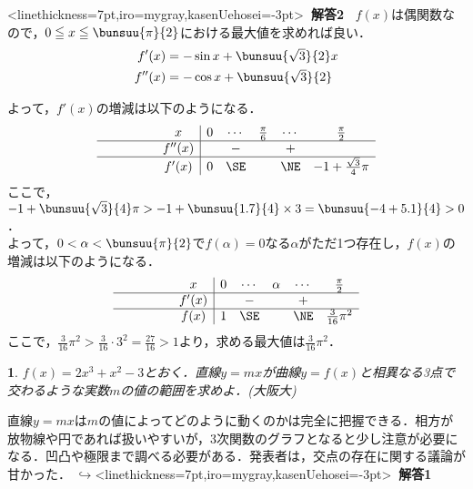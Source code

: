\documentclass[10pt,
b5paper,
fleqn,
dvipdfmx,
uplatex
]{jsarticle}
\newtheorem{question}[Question]{}
\newcommand{\bqu}{\begin{mybox}\begin{question}}
\newcommand{\equ}{\end{question}\end{mybox}}
\newcommand{\bb}{\bf\boldmath}%
\newcommand{\sq}{\textstyle\sqrt}
\renewenvironment{leftbar}{%
\def\FrameCommand{\vrule width 1pt \hspace{1zw}}
\MakeFramed{\advance\hsize-\width \FrameRestore}}%
{\endMakeFramed}
\newenvironment{leftbbar}{%
\def\FrameCommand{\color{mygray} \vrule width 5pt \hspace{1zw}
\color{black}}%
\MakeFramed {\advance\hsize-\width \FrameRestore}}%
{\endMakeFramed}
\newenvironment{アプローチ}{
\hspace{-2zw}\underbar{\large \bf Approach}\vspace{-1zw}\begin{leftbar}}{\end{leftbar}}
\newenvironment{解答2}{
\hspace{-2zw}\phkasen<linethickness=7pt,iro=mygray,kasenUehosei=-3pt>{\bf \large \ 解答2\ }\vspace{-1zw}\begin{leftbbar}}{\end{leftbbar}}
\newcommand{\kaitoui}{{\bb \color{mygray} $\hookrightarrow$}\phkasen<linethickness=7pt,iro=mygray,kasenUehosei=-3pt>{\bf \ 解答1\ }}
\newif\ifkaisetu
\begin{document}
{\begin{解答2}
$f(x)$は偶関数なので，$0\leqq x \leqq \bunsuu{\pi}{2}$における最大値を求めれば良い．
\begin{align*}
f'(x)&=-\sin x+\bunsuu{\sq{3}}{2}x\\
f''(x)&=-\cos x +\bunsuu{\sq{3}}{2}
\end{align*}
\begin{mawarikomi}{}{
\iffigure
{}
\fi
}
よって，$f'(x)$の増減は以下のようになる．
\[\begin{array}{c|cccccc}
\phantom{\bunsuu 11} x	&0		&\cdots	&\frac {\pi}{6} 	&\cdots	&\frac{\pi}{2} 	\\\hline
\phantom{\bunsuu 11}f''(x)	&		&-		&				&+		&				\\\hline
\phantom{\bunsuu 11}f'(x)	&0		&\SE	&				&\NE	&-1+\frac{\sqrt{3}}{4}\pi\\
\end{array}\]
ここで，$-1+\bunsuu{\sq{3}}{4}\pi >-1+\bunsuu{1.7}{4}\times 3=\bunsuu{-4+5.1}{4}>0$．\\
よって，$0<\alpha<\bunsuu{\pi}{2}$で$f(\alpha)=0$なる$\alpha$がただ1つ存在し，$f(x)$の増減は以下のようになる．
\[\begin{array}{c|cccccc}
\phantom{\bunsuu 11} x	&0		&\cdots	&\alpha 	&\cdots	&\frac{\pi}{2} 	\\\hline
\phantom{\bunsuu 11}f'(x)	&		&-		&		&+		&				\\\hline
\phantom{\bunsuu 11}f(x)	&1		&\SE	&		&\NE	&\frac{3}{16}\pi^2\\
\end{array}
\]
ここで，$\frac{3}{16}\pi^2>\frac{3}{16}\cdot 3^2=\frac{27}{16}>1$より，求める最大値は{\bb $\frac{3}{16}\pi^2$}．
\end{mawarikomi}
\end{解答2}
\newpage
\fi


\bqu $f(x)=2x^3+x^2-3$とおく．直線$y=mx$が曲線$y=f(x)$と相異なる3点で交わるような実数$m$の値の範囲を求めよ．\hfill(大阪大)
\equ

\ifkaisetu
\begin{アプローチ}
直線$y=mx$は$m$の値によってどのように動くのかは完全に把握できる．相方が放物線や円であれば扱いやすいが，3次関数のグラフとなると少し注意が必要になる．凹凸や極限まで調べる必要がある．発表者は，交点の存在に関する議論が甘かった．
\kaitoui


\end{アプローチ}}
\end{document}
